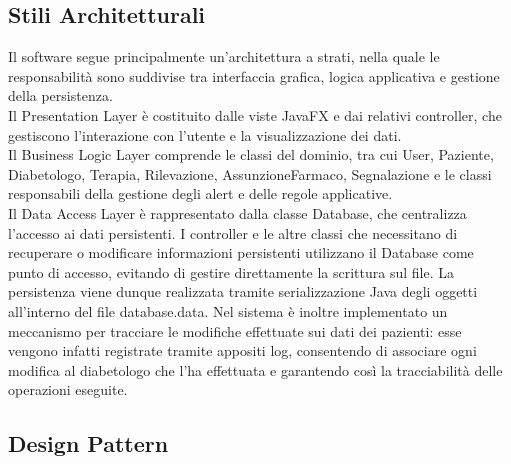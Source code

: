 \subsection{Stili Architetturali}

Il software segue principalmente un'architettura a strati, nella quale le responsabilità sono suddivise tra interfaccia grafica, logica applicativa e gestione della persistenza.\\
Il Presentation Layer è costituito dalle viste JavaFX e dai relativi controller, che gestiscono l'interazione con l'utente e la visualizzazione dei dati.\\
Il Business Logic Layer comprende le classi del dominio, tra cui User, Paziente, Diabetologo, Terapia, Rilevazione, AssunzioneFarmaco, Segnalazione e le classi responsabili della gestione degli alert e delle regole applicative.\\
Il Data Access Layer è rappresentato dalla classe Database, che centralizza l'accesso ai dati persistenti. I controller e le altre classi che necessitano di recuperare o modificare informazioni persistenti utilizzano il Database come punto di accesso, evitando di gestire direttamente la scrittura sul file. La persistenza viene dunque realizzata tramite serializzazione Java degli oggetti all'interno del file database.data. Nel sistema è inoltre implementato un meccanismo per tracciare le modifiche effettuate sui dati dei pazienti: esse vengono infatti registrate tramite appositi log, consentendo di associare ogni modifica al diabetologo che l'ha effettuata e garantendo così la tracciabilità delle operazioni eseguite.

\subsection{Design Pattern}

